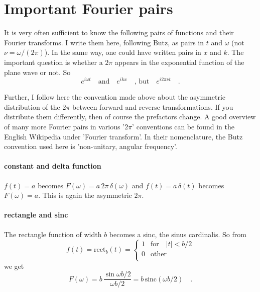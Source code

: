 \section{Important Fourier pairs}

It is very often sufficient to know the following pairs of functions and their Fourier transforms. I write them here, following Butz, as pairs in $t$ and $\omega$ (not $\nu = \omega / (2 \pi)$). In the same way, one could have written pairs in $x$ and $k$. The important question is whether a $2 \pi$ appears in the exponential function of the plane wave or not. So
\begin{equation}
e^{i \omega t} \quad \text{and} \quad e^{i k x} \quad \text{, but} \quad 
e^{i 2 \pi \nu t} \quad .
\end{equation}

Further, I follow here the convention made above about the asymmetric distribution of the $2 \pi$ between forward and reverse transformations. If you distribute them differently, then of course the prefactors change. A good overview of many more Fourier pairs in various '$2 \pi$' conventions can be found in the English Wikipedia under 'Fourier transform'. In their nomenclature, the Butz convention used here is 'non-unitary, angular frequency'.

\paragraph{constant and delta function} $f(t) = a$ becomes $F(\omega) = a \, 2 \pi \, \delta(\omega)$ and $f(t) = a \, \delta(t)$ becomes $F(\omega) = a $. This is again the asymmetric $2 \pi$.


\paragraph{rectangle and sinc} The rectangle function of width $b$ becomes a sinc, the sinus cardinalis. So from
\begin{equation}
 f(t) = \text{rect} _b (t) = \left\{ 
 \begin{array}{ll}
 1 & \text{for} \quad |t| < b/2 \\
 0 & \text{other} \\
 \end{array}
 \right.
\end{equation}
we get
\begin{equation}
F(\omega) = b \, \frac{\sin \omega b / 2}{\omega b /2} = b \, \text{sinc}( \omega b /2) \quad .
\end{equation}



